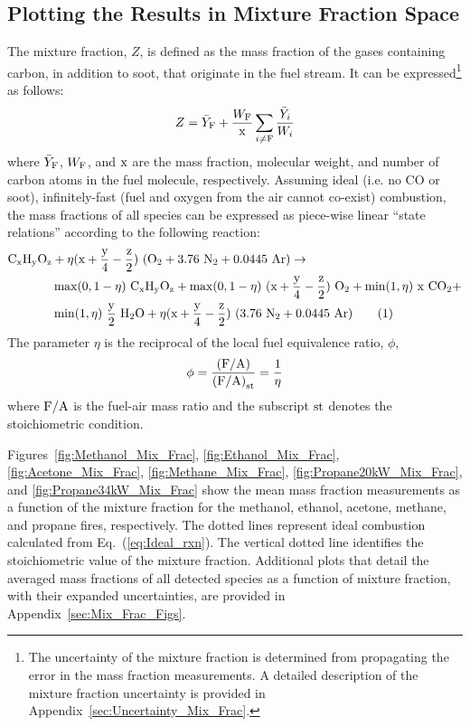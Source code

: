 \documentclass[12pt]{article}
\newcommand\numberthis{\addtocounter{equation}{1}\tag{\theequation}}
\begin{document}
\subsection{Plotting the Results in Mixture Fraction Space}
\label{ssec:Mixture_Fraction_Results}

The mixture fraction, $Z$, is defined as the mass fraction of the gases containing carbon, in addition to soot, that originate in the fuel stream. It can be expressed\footnote{The uncertainty of the mixture fraction is determined from propagating the error in the mass fraction measurements. A detailed description of the mixture fraction uncertainty is provided in Appendix~\ref{sec:Uncertainty_Mix_Frac}.} as follows:
\begin{equation}\label{eq:Mixture_Fraction}
  Z = \bar{Y}_{\rm F} + \frac{W_{\rm F}}{\rm x} \sum_{i\ne {\rm F}} \frac{\bar{Y}_i}{W_{i}}
\end{equation}
where $\bar{Y}_{\rm F}$, ${W_{\rm F}}$, and $\rm x$ are the mass fraction, molecular weight, and number of carbon atoms in the fuel molecule, respectively. Assuming ideal (i.e. no CO or soot), infinitely-fast (fuel and oxygen from the air cannot co-exist) combustion, the mass fractions of all species can be expressed as piece-wise linear ``state relations'' according to the following reaction:
\begin{align*}
{\rm C}_{\rm x}{\rm H}_{\rm y}{\rm O}_{\rm z} & +\eta(\rm x+\frac{\rm y}{4}-\frac{\rm z}{2})~({\rm O}_{2}+3.76~{\rm N}_{2}+0.0445~{\rm Ar}) \rightarrow  \\
          & \max(0,1-\eta)~{\rm C}_{\rm x}{\rm H}_{\rm y}{\rm O}_{\rm z}+\max(0,1-\eta)~(\rm x+\frac{\rm y}{4}-\frac{\rm z}{2})~{\rm O}_{2}+ \min(1,\eta)~\rm x~{\rm CO}_{2} +  \\
          & \min(1,\eta)~\frac{\rm y}{2}~{\rm H}_{2}{\rm O}+\eta(\rm x+\frac{\rm y}{4}-\frac{\rm z}{2})~(3.76~{\rm N}_{2}+0.0445~{\rm Ar})  \numberthis \label{eq:Ideal_rxn}
\end{align*}
The parameter $\eta$ is the reciprocal of the local fuel equivalence ratio, $\phi$,
\begin{equation}\label{eq:Eta}
\phi=\frac{\rm (F/A)}{{\rm (F/A)}_{\rm st}}=\frac{1}{\eta}
\end{equation}
where $\rm F/A$ is the fuel-air mass ratio and the subscript $\rm st$ denotes the stoichiometric condition.

Figures~\ref{fig:Methanol_Mix_Frac}, \ref{fig:Ethanol_Mix_Frac}, \ref{fig:Acetone_Mix_Frac}, \ref{fig:Methane_Mix_Frac}, \ref{fig:Propane20kW_Mix_Frac}, and \ref{fig:Propane34kW_Mix_Frac} show the mean mass fraction measurements as a function of the mixture fraction for the methanol, ethanol, acetone, methane, and propane fires, respectively. The dotted lines represent ideal combustion calculated from Eq.~(\ref{eq:Ideal_rxn}). The vertical dotted line identifies the stoichiometric value of the mixture fraction. Additional plots that detail the averaged mass fractions of all detected species as a function of mixture fraction, with their expanded uncertainties, are provided in Appendix~\ref{sec:Mix_Frac_Figs}.
\end{document}
